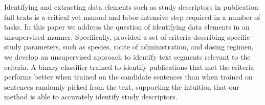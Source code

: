 Identifying and extracting data elements such as study descriptors in publication full texts is a critical yet manual and labor-intensive step required in a number of tasks. In this paper we address the question of identifying data elements in an unsupervised manner. Specifically, provided a set of criteria describing specific study parameters, such as species, route of administration, and dosing regimen, we develop an unsupervised approach to identify text segments relevant to the criteria. A binary classifier trained to identify publications that met the criteria performs better when trained on the candidate sentences than when trained on sentences randomly picked from the text, supporting the intuition that our method is able to accurately identify study descriptors.
